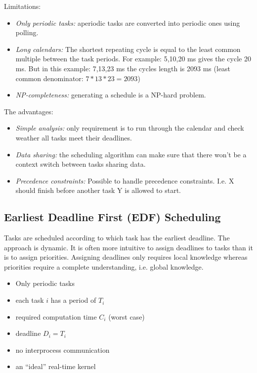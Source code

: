 \documentclass[a4paper]{article}
\begin{document}
Limitations:
\begin{itemize}
  \item \emph{Only periodic tasks:} aperiodic tasks are converted into periodic
        ones using polling.
  \item \emph{Long calendars:} The shortest repeating cycle is equal to the least
        common multiple between the task periods. For example: 5,10,20 ms gives
        the cycle 20 ms. But in this example: 7,13,23 ms the cycles length is
        2093 ms (least common denominator: $7*13*23=2093$)
  \item \emph{NP-completeness:} generating a schedule is a NP-hard problem.
\end{itemize}

The advantages:
\begin{itemize}
  \item \emph{Simple analysis:} only requirement is to run through the calendar
        and check weather all tasks meet their deadlines.
  \item \emph{Data sharing:} the scheduling algorithm can make sure that there
        won't be a context switch between tasks sharing data.
  \item \emph{Precedence constraints:} Possible to handle precedence constraints.
        I.e. X should finish before another task Y is allowed to start.
\end{itemize}

\subsection{Earliest Deadline First (EDF) Scheduling}

Tasks are scheduled according to which task has the earliest deadline. The
approach is dynamic. It is often more intuitive to assign deadlines to tasks
than it is to assign priorities. Assigning deadlines only requires local knowledge
whereas priorities require a complete understanding, i.e. global knowledge.

\begin{itemize}
  \item Only periodic tasks
  \item each task $i$ has a period of $T_i$
  \item required computation time $C_i$ (worst case)
  \item deadline $D_i = T_i$
  \item no interprocess communication
  \item an ``ideal'' real-time kernel
\end{itemize}
\end{document}

